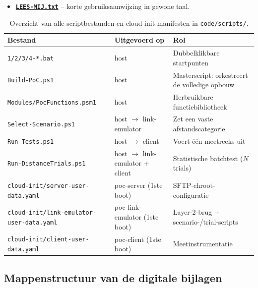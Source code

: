 \begin{itemize}
        \textbf{\href{code/scripts/cloud-init/link-emulator-user-data.yaml}{\texttt{cloud-init/link-emulator-user-data.yaml}}},
        \textbf{\href{code/scripts/cloud-init/client-user-data.yaml}{\texttt{cloud-init/client-user-data.yaml}}}
        -- de drie cloud-init-manifesten uit Sectie~\ref{subsec:automatisering-cloudinit},
        die onder meer \texttt{poc-set-scenario.sh} en \texttt{poc-run-trial.sh} op de
        link-emulator installeren.
  \item \textbf{\href{code/scripts/LEES-MIJ.txt}{\texttt{LEES-MIJ.txt}}} -- korte
        gebruiksaanwijzing in gewone taal.
\end{itemize}

\begin{table}[h]
  \centering
  \small
  \begin{tabular}{p{4.6cm}p{2.6cm}p{6.2cm}}
    \toprule
    \textbf{Bestand} & \textbf{Uitgevoerd op} & \textbf{Rol} \\
    \midrule
    \texttt{1/2/3/4-*.bat} & host & Dubbelklikbare startpunten \\
    \texttt{Build-PoC.ps1} & host & Masterscript: orkestreert de volledige opbouw \\
    \texttt{Modules/PocFunctions.psm1} & host & Herbruikbare functiebibliotheek \\
    \texttt{Select-Scenario.ps1} & host $\to$ link-emulator & Zet een vaste afstandscategorie \\
    \texttt{Run-Tests.ps1} & host $\to$ client & Voert één meetreeks uit \\
    \texttt{Run-DistanceTrials.ps1} & host $\to$ link-emulator + client & Statistische batchtest ($N$ trials) \\
    \texttt{cloud-init/server-user-data.yaml} & poc-server (1ste boot) & SFTP-chroot-configuratie \\
    \texttt{cloud-init/link-emulator-user-data.yaml} & poc-link-emulator (1ste boot) & Layer-2-brug + scenario-/trial-scripts \\
    \texttt{cloud-init/client-user-data.yaml} & poc-client (1ste boot) & Meetinstrumentatie \\
    \bottomrule
  \end{tabular}
  \caption{Overzicht van alle scriptbestanden en cloud-init-manifesten in
  \texttt{code/scripts/}.}
  \label{tab:scriptoverzicht-poc}
\end{table}

\subsection{Mappenstructuur van de digitale bijlagen}%
\label{subsec:poc-mappenstructuur}


